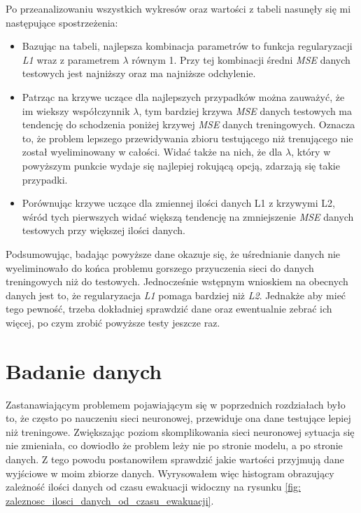 \documentclass[12pt]{aghdpl}
\begin{document}
		Po przeanalizowaniu wszystkich wykresów oraz wartości z tabeli nasunęły się mi następujące spostrzeżenia:
		\begin{itemize}
		\item Bazując na tabeli, najlepsza kombinacja parametrów to funkcja regularyzacji \textit{L1} wraz z parametrem $\lambda$ równym 1. Przy tej kombinacji średni \textit{MSE} danych testowych jest najniższy oraz ma najniższe odchylenie.
		\item Patrząc na krzywe uczące dla najlepszych przypadków można zauważyć, że im wiekszy współczynnik $\lambda$, tym bardziej krzywa \textit{MSE} danych testowych ma tendencję do schodzenia poniżej krzywej \textit{MSE} danych treningowych. Oznacza to, że problem lepszego przewidywania zbioru testującego niż trenującego nie został wyeliminowany w całości. Widać także na nich, że dla $\lambda$, który w powyższym punkcie wydaje się najlepiej rokującą opcją, zdarzają się takie przypadki.
		\item Porównując krzywe uczące dla zmiennej ilości danych L1 z krzywymi L2, wśród tych pierwszych widać większą tendencję na zmniejszenie \textit{MSE} danych testowych przy większej ilości danych.
		\end{itemize}				
		
		Podsumowując, badając powyższe dane okazuje się, że uśrednianie danych nie wyeliminowało do końca problemu gorszego przyuczenia sieci do danych treningowych niż do testowych. Jednocześnie wstępnym wnioskiem na obecnych danych jest to, że regularyzacja \textit{L1} pomaga bardziej niż \textit{L2}. Jednakże aby mieć tego pewność, trzeba dokładniej sprawdzić dane oraz ewentualnie zebrać ich więcej, po czym zrobić powyższe testy jeszcze raz.
		
		\section{Badanie danych}
		Zastanawiającym problemem pojawiającym się w poprzednich rozdziałach było to, że często po nauczeniu sieci neuronowej, przewiduje ona dane testujące lepiej niż treningowe. Zwiększając poziom skomplikowania sieci neuronowej sytuacja się nie zmieniała, co dowiodło że problem leży nie po stronie modelu, a po stronie danych. Z tego powodu postanowiłem sprawdzić jakie wartości przyjmują dane wyjściowe w moim zbiorze danych. Wyrysowałem więc histogram obrazujący zależność ilości danych od czasu ewakuacji widoczny na rysunku \ref{fig: zaleznosc_ilosci_danych_od_czasu_ewakuacji}.
		
\end{document}
